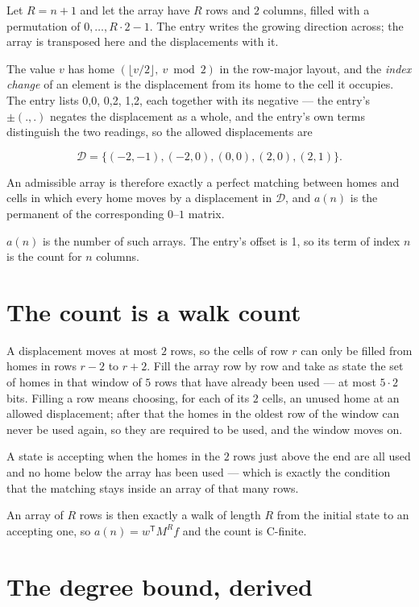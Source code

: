 \documentclass[11pt]{article}
\theoremstyle{definition}
\begin{document}
Let $R = n + 1$ and let the array have $R$ rows and $2$ columns, filled with a permutation of $0,\dots,R\cdot2-1$. The entry writes the growing direction across; the array is transposed here and the displacements with it.

The value $v$ has home $(\lfloor v/2\rfloor,\ v \bmod 2)$ in the row-major layout, and the {\itshape index change} of an element is the displacement from its home to the cell it occupies. The entry lists 0,0, 0,2, 1,2, each together with its negative --- the entry's $\pm(.,.)$ negates the displacement as a whole, and the entry's own terms distinguish the two readings, so the allowed displacements are

\[\mathcal{D} = \{(-2,-1), (-2,0), (0,0), (2,0), (2,1)\}.\]

An admissible array is therefore exactly a perfect matching between homes and cells in which every home moves by a displacement in $\mathcal{D}$, and $a(n)$ is the permanent of the corresponding $0$--$1$ matrix.

$a(n)$ is the number of such arrays. The entry's offset is 1, so its term of index $n$ is the count for $n$ columns.

\section{The count is a walk count}

A displacement moves at most $2$ rows, so the cells of row $r$ can only be filled from homes in rows $r-2$ to $r+2$. Fill the array row by row and take as state the set of homes in that window of $5$ rows that have already been used --- at most $5\cdot2$ bits. Filling a row means choosing, for each of its $2$ cells, an unused home at an allowed displacement; after that the homes in the oldest row of the window can never be used again, so they are required to be used, and the window moves on.

A state is accepting when the homes in the $2$ rows just above the end are all used and no home below the array has been used --- which is exactly the condition that the matching stays inside an array of that many rows.

An array of $R$ rows is then exactly a walk of length $R$ from the initial state to an accepting one, so $a(n) = w^{\mathsf T}M^{R}f$ and the count is C-finite.

\section{The degree bound, derived}
\end{document}
